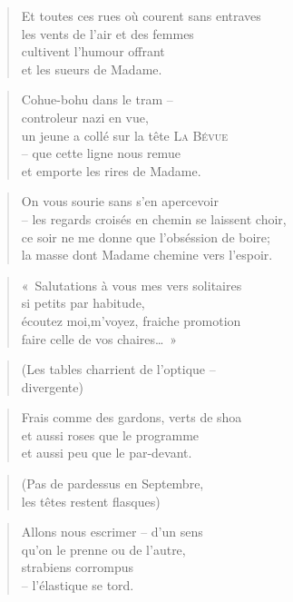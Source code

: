   \begin{verse}
    Et toutes ces rues où courent sans entraves\\
    les vents de l’air et des femmes\\
    cultivent l’humour offrant\\
    et les sueurs de Madame.
  \end{verse}
  \begin{verse}
    Cohue-bohu dans le tram --\\
    controleur nazi en vue,\\
    un jeune a collé sur la tête \textsc{La Bévue} \\
    -- que cette ligne nous remue\\
    et emporte les rires de Madame.
  \end{verse}
  \begin{verse}
    On vous sourie sans s’en apercevoir\\
    -- les regards croisés en chemin se laissent choir,\\
    ce soir ne me donne que l’obséssion de boire;\\
    la masse dont Madame chemine vers l’espoir.
  \end{verse}
  \begin{verse}
    «~Salutations à vous mes vers solitaires\\
    si petits par habitude,\\
    écoutez moi,m’voyez, fraiche promotion\\
    faire celle de vos chaires…~»
  \end{verse}
  \begin{verse}
    (Les tables charrient de l’optique --\\
    divergente)
  \end{verse}
  \begin{verse}
    Frais comme des gardons, verts de shoa\\
    et aussi roses que le programme\\
    et aussi peu que le par-devant.
  \end{verse}
  \begin{verse}
    (Pas de pardessus en Septembre,\\
    les têtes restent flasques)
  \end{verse}
  \begin{verse}
    Allons nous escrimer -- d’un sens\\
    qu’on le prenne ou de l’autre,\\
    strabiens corrompus\\
    -- l’élastique se tord.
  \end{verse}
